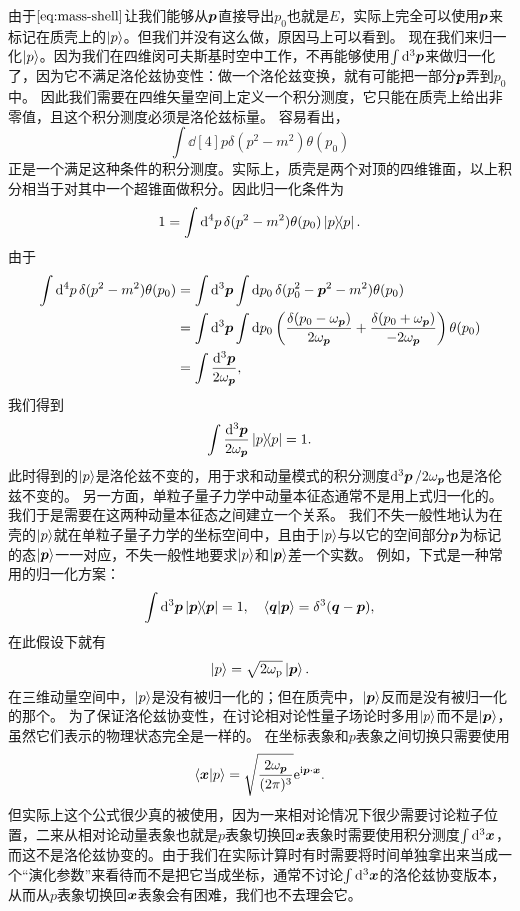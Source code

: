\documentclass[hyperref, UTF8, a4paper]{ctexart}
\newcommand*{\ii}{\mathrm{i}}
\newcommand*{\ee}{\mathrm{e}}
\begin{document}
由于$\eqref{eq:mass-shell}$让我们能够从$\vb*{p}$直接导出$p_0$也就是$E$，实际上完全可以使用$\vb*{p}$来标记在质壳上的$\ket{p}$。但我们并没有这么做，原因马上可以看到。
现在我们来归一化$\ket{p}$。因为我们在四维闵可夫斯基时空中工作，不再能够使用$\int \dd[3]{\vb*{p}}$来做归一化了，因为它不满足洛伦兹协变性：做一个洛伦兹变换，就有可能把一部分$\vb*{p}$弄到$p_0$中。
因此我们需要在四维矢量空间上定义一个积分测度，它只能在质壳上给出非零值，且这个积分测度必须是洛伦兹标量。
容易看出，
\[
    \int \dd[4]{p} \delta(p^2 - m^2) \theta(p_0)
\]
正是一个满足这种条件的积分测度。实际上，质壳是两个对顶的四维锥面，以上积分相当于对其中一个超锥面做积分。因此归一化条件为
\[
    1 = \int \dd[4]{p} \delta(p^2 - m^2) \theta(p_0) \dyad{p}.
\]
由于
\[
    \begin{aligned}
        \int \dd[4]{p} \delta(p^2 - m^2) \theta(p_0) &= \int \dd[3]{\vb*{p}} \int \dd{p_0} \delta (p_0^2 - \vb*{p}^2 - m^2) \theta(p_0) \\
        &= \int \dd[3]{\vb*{p}} \int \dd{p_0} \left( \frac{\delta(p_0 - \omega_{\vb*{p}})}{2 \omega_{\vb*{p}}} + \frac{\delta(p_0 + \omega_{\vb*{p}})}{- 2 \omega_{\vb*{p}}} \right) \theta (p_0) \\
        &= \int \frac{\dd[3]{\vb*{p}}}{2 \omega_{\vb*{p}}},
    \end{aligned}
\]
我们得到
\[
    \int \frac{\dd[3]{\vb*{p}}}{2\omega_{\vb*{p}}} \dyad{p} = 1.
\]
此时得到的$\ket{p}$是洛伦兹不变的，用于求和动量模式的积分测度$\dd[3]{\vb*{p}} / 2 \omega_{\vb*{p}}$也是洛伦兹不变的。
另一方面，单粒子量子力学中动量本征态通常不是用上式归一化的。我们于是需要在这两种动量本征态之间建立一个关系。
我们不失一般性地认为在壳的$\ket{p}$就在单粒子量子力学的坐标空间中，且由于$\ket{p}$与以它的空间部分$\vb*{p}$为标记的态$\ket{\vb*{p}}$一一对应，不失一般性地要求$\ket{p}$和$\ket{\vb*{p}}$差一个实数。
例如，下式是一种常用的归一化方案：
\[
    \int \dd[3]{\vb*{p}} \dyad{\vb*{p}} = 1, \quad \braket{\vb*{q}}{\vb*{p}} = \delta^3(\vb*{q} - \vb*{p}),
\]
在此假设下就有
\begin{equation}
    \ket{p} = \sqrt{2 \omega_{\text{p}}} \ket{\vb*{p}}.
\end{equation}
在三维动量空间中，$\ket{p}$是没有被归一化的；但在质壳中，$\ket{\vb*{p}}$反而是没有被归一化的那个。
为了保证洛伦兹协变性，在讨论相对论性量子场论时多用$\ket{p}$而不是$\ket{\vb*{p}}$，虽然它们表示的物理状态完全是一样的。
在坐标表象和$p$表象之间切换只需要使用
\begin{equation}
    \braket{\vb*{x}}{p} = \sqrt{\frac{2 \omega_{\vb*{p}}}{(2\pi)^3}} \ee^{\ii \vb*{p} \cdot \vb*{x}}.
    \label{eq:relativity-x-p-trans}
\end{equation}
但实际上这个公式很少真的被使用，因为一来相对论情况下很少需要讨论粒子位置，二来从相对论动量表象也就是$p$表象切换回$\vb*{x}$表象时需要使用积分测度$\int \dd[3]{\vb*{x}}$，而这不是洛伦兹协变的。由于我们在实际计算时有时需要将时间单独拿出来当成一个“演化参数”来看待而不是把它当成坐标，通常不讨论$\int \dd[3]{\vb*{x}}$的洛伦兹协变版本，从而从$p$表象切换回$\vb*{x}$表象会有困难，我们也不去理会它。
\end{document}
